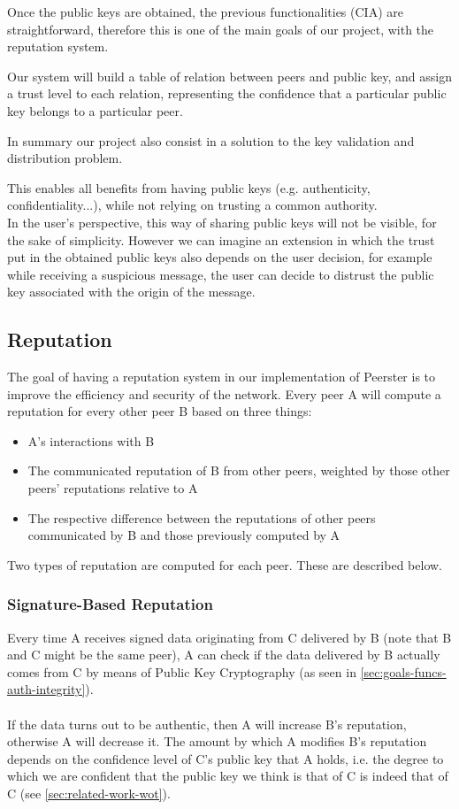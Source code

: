 \documentclass[]{article}
\begin{document}
Once the public keys are obtained, the previous functionalities (CIA) are straightforward, therefore this is one of the main goals of our project, with the reputation system.

Our system will build a table of relation between peers and public key, and assign a trust level to each relation, representing the confidence that a particular public key belongs to a particular peer.

In summary our project also consist in a solution to the key validation and distribution problem. 

This enables all benefits from having public keys (e.g. authenticity, confidentiality...), while not relying on trusting a common authority. \\

In the user's perspective, this way of sharing public keys will not be visible, for the sake of simplicity. However we can imagine an extension in which the trust put in the obtained public keys also depends on the user decision, for example while receiving a suspicious message, the user can decide to distrust the public key associated with the origin of the message.

\subsection{Reputation}
\label{sec:goals-funcs-rep}
The goal of having a reputation system in our implementation of Peerster is to improve the efficiency and security of the network.
Every peer A will compute a reputation for every other peer B based on three things:

\begin{itemize}
\item A's interactions with B
\item The communicated reputation of B from other peers, weighted by those other peers' reputations relative to A
\item The respective difference between the reputations of other peers communicated by B and those previously computed by A
\end{itemize}

Two types of reputation are computed for each peer. These are described below.

\subsubsection{Signature-Based Reputation}
\label{sec:sig-based-rep}
Every time A receives signed data originating from C delivered by B (note that B and C might be the same peer), A can check if the data delivered by B actually comes from C by means of Public Key Cryptography (as seen in \ref{sec:goals-funcs-auth-integrity}).
\\\\
If the data turns out to be authentic, then A will increase B's reputation, otherwise A will decrease it.
The amount by which A modifies B's reputation depends on the confidence level of C's public key that A holds, i.e. the degree to which we are confident that the public key we think is that of C is indeed that of C (see \ref{sec:related-work-wot}).
\end{document}
